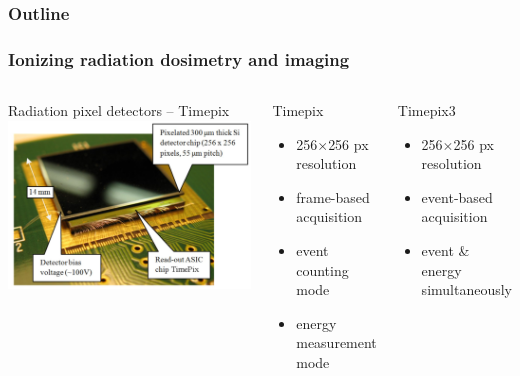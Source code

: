 \documentclass[aspectratio=169]{beamer}
\begin{document}
\begin{frame}
  \frametitle{Outline}
  \tableofcontents[currentsection]
\end{frame}


\begin{frame}
\frametitle{Ionizing radiation dosimetry and imaging}

  \begin{columns}[c]
  
  \begin{block}{Radiation pixel detectors -- Timepix}
    \includegraphics[width=1.0\textwidth]{./fig/timepix.jpg}
  \end{block} 
  
  \begin{block}{Timepix}
    \begin{itemize}
      \item 256$\times$256 px resolution
      \item frame-based acquisition
      \item event counting mode
      \item energy measurement mode
    \end{itemize}
  \end{block}

  \begin{block}{Timepix3}
    \begin{itemize}
      \item 256$\times$256 px resolution
      \item event-based acquisition
      \item event \& energy simultaneously
    \end{itemize}
  \end{block}

  \end{columns}

\end{frame}
\end{document}
